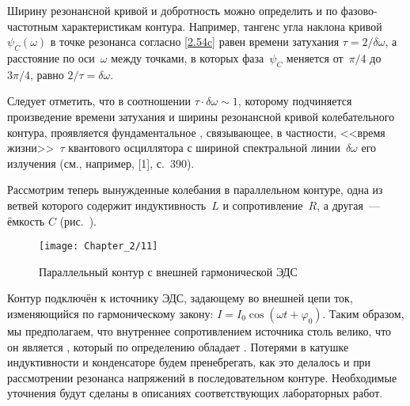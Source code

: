 Ширину резонансной кривой и добротность можно определить и по
фазово-частотным характеристикам контура. Например, тангенс угла наклона
кривой $\psi_C(\omega)$ в точке резонанса согласно \eqref{2.54c} равен времени
затухания $\tau=2/\delta\omega$, а расстояние по оси~$\omega$ между точками, в
которых фаза~$\psi_C$ меняется от~$\pi/4$ до~$3\pi/4$, равно
$2/\tau=\delta\omega$.

Следует отметить, что в соотношении $\tau\cdot\delta\omega\sim1$, которому
подчиняется произведение времени затухания и ширины резонансной кривой
колебательного контура, проявляется фундаментальное , связывающее, в частности, <<время жизни>>~$\tau$ квантового
осциллятора с шириной спектральной линии~$\delta\omega$ его излучения (см.,
например, [1], с.~390).


Рассмотрим теперь вынужденные колебания в параллельном контуре, одна из ветвей
которого содержит индуктивность~$L$ и сопротивление~$R$, а другая~--- ёмкость
$C$ (рис.~).
\begin{center}
	\begin{figure}[h!]
		\centering\texttt{[image: Chapter\_2/11]}
		\caption{Параллельный контур с внешней гармонической ЭДС}
	\end{figure}
\end{center}

Контур подключён к источнику ЭДС, задающему во внешней цепи ток, изменяющийся по
гармоническому закону: $I=I_0\cos(\omega t+\varphi_0)$. Таким образом, мы
предполагаем, что внутреннее сопротивлением источника столь велико, что он
является , который по определению обладает
. Потерями в катушке
индуктивности и конденсаторе будем пренебрегать, как это делалось и при
рассмотрении резонанса напряжений в последовательном контуре. Необходимые
уточнения будут сделаны в описаниях соответствующих лабораторных работ.


